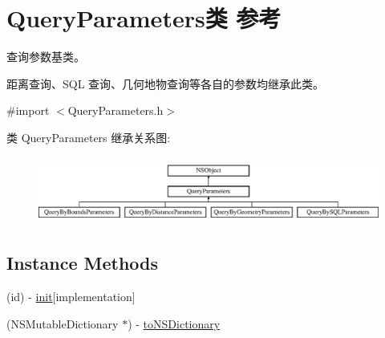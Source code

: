 \hypertarget{interface_query_parameters}{\section{Query\-Parameters类 参考}
\label{interface_query_parameters}
}


查询参数基类。\par
 距离查询、\-S\-Q\-L 查询、几何地物查询等各自的参数均继承此类。  




{\ttfamily \#import $<$Query\-Parameters.\-h$>$}

类 Query\-Parameters 继承关系图\-:\begin{figure}[H]
\begin{center}
\leavevmode
\includegraphics[height=2.222222cm]{interface_query_parameters}
\end{center}
\end{figure}
\subsection*{Instance Methods}
\begin{DoxyCompactItemize}
\item 
(id) -\/ \hyperlink{interface_query_parameters_ab34003baea3fb15a37fc89bff33304c3}{init}{\ttfamily  \mbox{[}implementation\mbox{]}}
\item 
(N\-S\-Mutable\-Dictionary $\ast$) -\/ \hyperlink{interface_query_parameters_a2c76ebeaa300c4397083ba6d5e225f59}{to\-N\-S\-Dictionary}
\end{DoxyCompactItemize}
